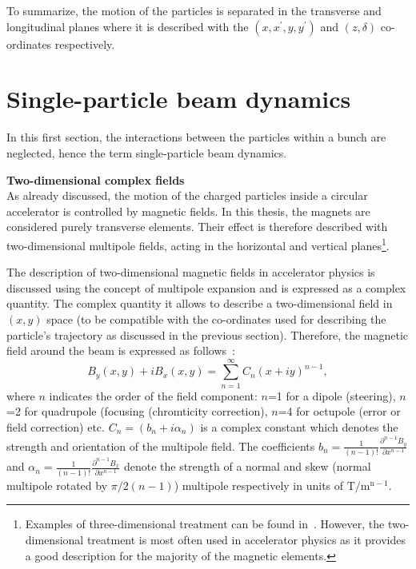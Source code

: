 
To summarize, the motion of the particles is separated in the transverse and longitudinal planes where it is described with the  $(x, x^\prime, y, y^\prime)$ and $(z, \delta)$ co-ordinates respectively.


\section{Single-particle beam dynamics}
In this first section, the interactions between the particles within a bunch are neglected, hence the term single-particle beam dynamics.

\textbf{Two-dimensional complex fields}\\
As already discussed, the motion of the charged particles inside a circular accelerator is controlled by magnetic fields. In this thesis, the magnets are considered purely transverse elements. Their effect is therefore described with two-dimensional multipole fields, acting in the horizontal and vertical planes\footnote{Examples of three-dimensional treatment can be found in~\cite{wolski2014, Beth:889480}. However, the two-dimensional treatment is most often used in accelerator physics as it provides a good description for the majority of the magnetic elements.}. %

The description of two-dimensional magnetic fields in accelerator physics is discussed using the concept of multipole expansion and is expressed as a complex quantity. The complex quantity it allows to describe a two-dimensional field in $(x,y)$ space (to be compatible with the co-ordinates used for describing the particle's trajectory as discussed in the previous section). Therefore, the magnetic field around the beam is expressed as follows~\cite{wolski2014}: 
\begin{equation}\label{eq:mult_expansion} %
    B_y(x,y) + i B_x(x,y) = \sum_{n=1}^{\infty} C_n (x+i y)^{n-1},
\end{equation} %
where $n$ indicates the order of the field component: $n$=1 for a dipole (steering), $n$=2 for quadrupole (focusing (chromticity correction), $n$=4 for octupole (error or field correction) etc. $C_n=(b_n +i \alpha_n)$ is a complex constant which denotes the strength and orientation of the multipole field. The coefficients $b_n=\frac{1}{(n-1)!} \frac{\partial^{n-1}B_y}{\partial x^{n-1}}$ and $\alpha_n=\frac{1}{(n-1)!} \frac{\partial^{n-1}B_x}{\partial x^{n-1}}$ denote the strength of a normal and skew (normal multipole rotated by $\pi/2(n-1)$) multipole respectively in units of $\mathrm{T/m^{n-1}}$.

